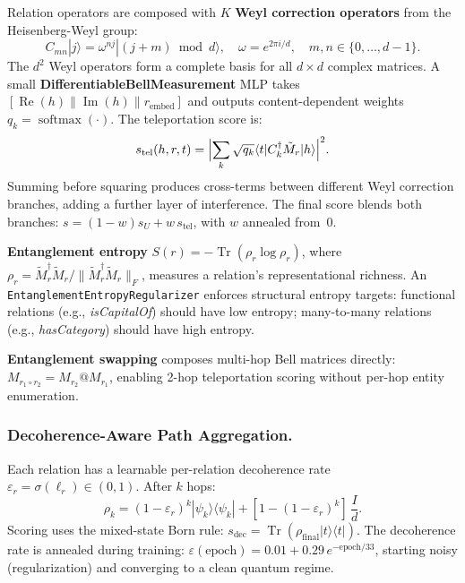 \documentclass[runningheads]{llncs}
\newcommand{\eps}{\varepsilon}
\newcommand{\dagop}{^\dagger}
\newcommand{\ket}[1]{|#1\rangle}
\newcommand{\bra}[1]{\langle#1|}
\newcommand{\braket}[2]{\langle#1|#2\rangle}
\begin{document}
Relation operators are composed with $K$ \textbf{Weyl correction operators}
from the Heisenberg-Weyl group:
\[
  C_{mn}\ket{j}=\omega^{nj}\ket{(j+m)\bmod d},\quad
  \omega=e^{2\pi i/d},\quad m,n\in\{0,\ldots,d-1\}.
\]
The $d^2$ Weyl operators form a complete basis for all $d\times d$ complex
matrices.  A small \textbf{DifferentiableBellMeasurement} MLP takes
$[\operatorname{Re}(h)\|\operatorname{Im}(h)\|r_\text{embed}]$ and outputs
content-dependent weights $q_k=\operatorname{softmax}(\cdot)$.  The
teleportation score is:
\begin{equation}
  s_\text{tel}(h,r,t)
  = \Bigl|\sum_k\sqrt{q_k}\braket{t}{C_k\dagop\tilde{M}_r|h}\Bigr|^2.
  \label{eq:tel}
\end{equation}
Summing before squaring produces cross-terms between different Weyl correction
branches, adding a further layer of interference.  The final score blends
both branches: $s=(1-w)s_U+w\,s_\text{tel}$, with $w$ annealed from~0.

\textbf{Entanglement entropy} $S(r)=-\operatorname{Tr}(\rho_r\log\rho_r)$,
where $\rho_r=\tilde{M}_r\dagop\tilde{M}_r/\|\tilde{M}_r\dagop\tilde{M}_r\|_F$,
measures a relation's representational richness.  An
\texttt{EntanglementEntropyRegularizer} enforces structural entropy targets:
functional relations (e.g., \textit{isCapitalOf}) should have low entropy;
many-to-many relations (e.g., \textit{hasCategory}) should have high entropy.

\textbf{Entanglement swapping} composes multi-hop Bell matrices directly:
$M_{r_1\circ r_2}=M_{r_2}@M_{r_1}$, enabling 2-hop teleportation scoring
without per-hop entity enumeration.

\subsubsection{Decoherence-Aware Path Aggregation.}
\label{sec:decohere}

Each relation has a learnable per-relation decoherence rate
$\eps_r=\sigma(\ell_r)\in(0,1)$.  After $k$ hops:
\begin{equation}
  \rho_k = (1-\eps_r)^k\ket{\psi_k}\bra{\psi_k}
  + [1-(1-\eps_r)^k]\,\frac{I}{d}.
  \label{eq:decohere_simple}
\end{equation}
Scoring uses the mixed-state Born rule:
$s_\text{dec}=\operatorname{Tr}(\rho_\text{final}\ket{t}\bra{t})$.
The decoherence rate is annealed during training:
$\eps(\text{epoch})=0.01+0.29\,e^{-\text{epoch}/33}$, starting noisy
(regularization) and converging to a clean quantum regime.
\end{document}
